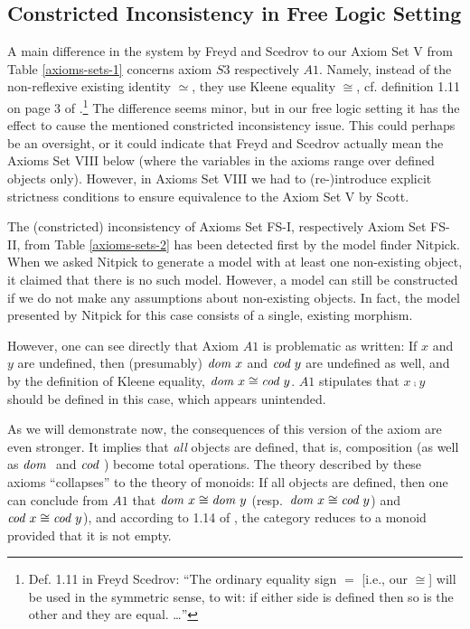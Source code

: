 \subsection{Constricted Inconsistency in Free Logic Setting} \label{subsec-freyd-scedrov-1}
  A main difference in the system by Freyd and Scedrov to our Axiom
  Set V from Table \ref{axioms-sets-1} concerns
  axiom $S3$ respectively $A1$. Namely, instead of the non-reflexive
  existing identity $\simeq$, they use Kleene 
  equality $\cong$, cf. definition 1.11 on page 3 of \cite{FreydScedrov90}.\footnote{Def. 1.11 in Freyd 
  Scedrov: ``The ordinary equality sign $=$ [i.e., our $\cong$] will be used in the
  symmetric sense, to wit: if either side is defined then so is the other and they are equal. \ldots''} 
  The difference seems minor, but in our free logic setting it has the effect to cause the mentioned
  constricted inconsistency issue. This could perhaps be an oversight, or it could indicate
  that Freyd and Scedrov actually mean the Axioms Set VIII below (where the variables in the axioms range 
  over defined objects only). However, in Axioms Set VIII we had to (re-)introduce explicit 
  strictness conditions to ensure equivalence to the Axiom Set V by
  Scott.

  The (constricted) inconsistency of Axioms Set FS-I, respectively
  Axiom Set FS-II, from Table \ref{axioms-sets-2} has been 
  detected first by the model finder Nitpick. When we asked Nitpick to
  generate a model with at least one non-existing object, it claimed
  that there is no such model. However, a model can still be
  constructed if we do not make any assumptions about non-existing
  objects. In fact, the model presented by Nitpick for this case
  consists of a single, existing morphism.

However, one can see directly that Axiom $A1$ is problematic
as written: If $x$ and $y$ are undefined, then
(presumably) $\textit{dom \/} x$ and $\textit{cod \/} y$ are undefined as
well, and by the definition of Kleene equality, $\textit{dom \/} x \cong \textit{cod \/}
  y$. $A1$ stipulates that $x \comp y$ should be defined in
this case, which appears unintended.

As we will demonstrate now, the consequences of this version of the axiom are
even stronger. It implies that \emph{all} objects are defined,
that is, composition (as well as $\textit{dom \/}$ and $\textit{cod \/}$) become total operations.
The theory described by these axioms ``collapses'' to the theory of
monoids: If all objects are defined, then one can conclude from $A1$ that 
$\textit{dom \/} x \cong \textit{dom \/} y$ (resp.~$\textit{dom \/} x \cong \textit{cod \/} y$) and $\textit{cod \/} x \cong \textit{cod \/} y$), 
and according to 1.14 of \cite{FreydScedrov90}, 
the category reduces to a monoid provided that it is not empty.

